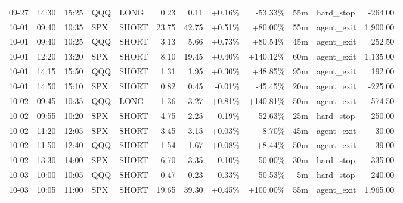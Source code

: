 \documentclass[11pt,a4paper,twoside]{article}
\begin{document}
\begin{center}
\begin{longtable}{>{\color{txtmain}}l l l l l r r r r r >{\color{txtmain}}l r}
09-27 & 14:30 & 15:25 & QQQ & LONG & 0.23 & 0.11 & \textcolor{wingreen}{+0.16\%} & \textcolor{lossred}{-53.33\%} & 55m & hard\_stop & \textcolor{lossred}{-264.00} \\
10-01 & 09:40 & 10:35 & SPX & SHORT & 23.75 & 42.75 & \textcolor{wingreen}{+0.51\%} & \textcolor{wingreen}{+80.00\%} & 55m & agent\_exit & \textcolor{wingreen}{1,900.00} \\
10-01 & 09:40 & 10:25 & QQQ & SHORT & 3.13 & 5.66 & \textcolor{wingreen}{+0.73\%} & \textcolor{wingreen}{+80.54\%} & 45m & agent\_exit & \textcolor{wingreen}{252.50} \\
10-01 & 12:20 & 13:20 & SPX & SHORT & 8.10 & 19.45 & \textcolor{wingreen}{+0.40\%} & \textcolor{wingreen}{+140.12\%} & 60m & agent\_exit & \textcolor{wingreen}{1,135.00} \\
10-01 & 14:15 & 15:50 & QQQ & SHORT & 1.31 & 1.95 & \textcolor{wingreen}{+0.30\%} & \textcolor{wingreen}{+48.85\%} & 95m & agent\_exit & \textcolor{wingreen}{192.00} \\
10-01 & 14:50 & 15:10 & SPX & SHORT & 0.82 & 0.45 & \textcolor{lossred}{-0.01\%} & \textcolor{lossred}{-45.45\%} & 20m & agent\_exit & \textcolor{lossred}{-225.00} \\
10-02 & 09:45 & 10:35 & QQQ & LONG & 1.36 & 3.27 & \textcolor{wingreen}{+0.81\%} & \textcolor{wingreen}{+140.81\%} & 50m & agent\_exit & \textcolor{wingreen}{574.50} \\
10-02 & 09:55 & 10:20 & SPX & SHORT & 4.75 & 2.25 & \textcolor{lossred}{-0.19\%} & \textcolor{lossred}{-52.63\%} & 25m & hard\_stop & \textcolor{lossred}{-250.00} \\
10-02 & 11:20 & 12:05 & SPX & SHORT & 3.45 & 3.15 & \textcolor{wingreen}{+0.03\%} & \textcolor{lossred}{-8.70\%} & 45m & agent\_exit & \textcolor{lossred}{-30.00} \\
10-02 & 11:50 & 12:40 & QQQ & SHORT & 1.54 & 1.67 & \textcolor{wingreen}{+0.08\%} & \textcolor{wingreen}{+8.44\%} & 50m & agent\_exit & \textcolor{wingreen}{39.00} \\
10-02 & 13:30 & 14:00 & SPX & SHORT & 6.70 & 3.35 & \textcolor{lossred}{-0.10\%} & \textcolor{lossred}{-50.00\%} & 30m & hard\_stop & \textcolor{lossred}{-335.00} \\
10-03 & 10:00 & 10:05 & QQQ & SHORT & 0.47 & 0.23 & \textcolor{lossred}{-0.33\%} & \textcolor{lossred}{-50.53\%} & 5m & hard\_stop & \textcolor{lossred}{-240.00} \\
10-03 & 10:05 & 11:00 & SPX & SHORT & 19.65 & 39.30 & \textcolor{wingreen}{+0.45\%} & \textcolor{wingreen}{+100.00\%} & 55m & agent\_exit & \textcolor{wingreen}{1,965.00} \\

\end{longtable}
\end{center}
\end{document}
